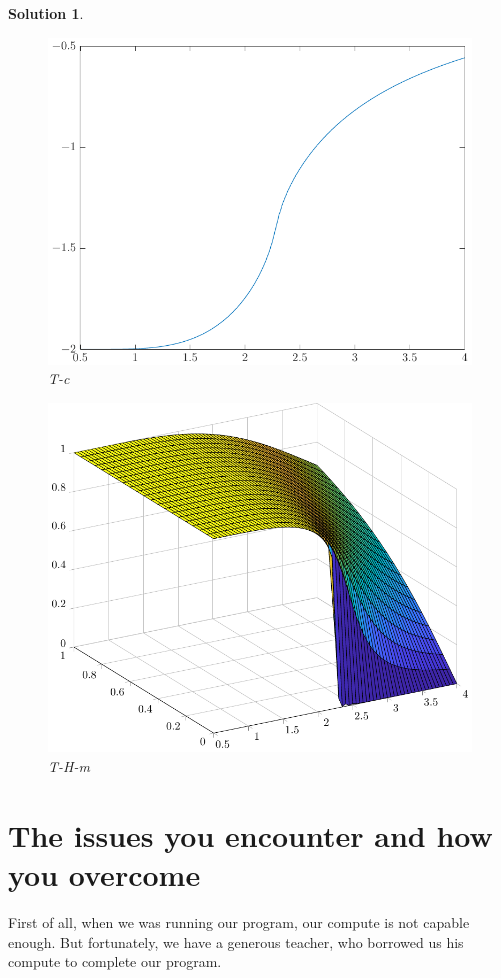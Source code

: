 \documentclass[11pt,openany]{book}              %
\newtheorem{solution}{Solution}
\begin{document}
\begin{solution}
	\begin{figure}\label{fig:Tc}
		\centering
		\includegraphics[width=0.8\linewidth]{Tu.pdf}
		\caption{T-c}
	\end{figure}
	\begin{figure}\label{fig:THM}
		\centering
		\includegraphics[width=0.8\linewidth]{THM.pdf}
		\caption{T-H-m}
	\end{figure}




\end{solution}

\section{The issues you encounter and how you overcome }
First of all, when we was running our program, our compute is not capable enough. But fortunately,
we have a generous teacher, who borrowed us his compute to complete our program.
\end{document}

